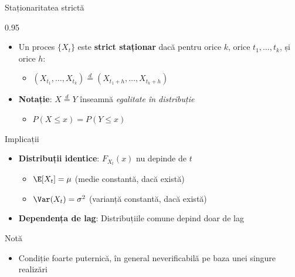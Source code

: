\documentclass[9pt, aspectratio=169, t]{beamer}
\begin{document}
\begin{frame}{Staționaritatea strictă}
    \begin{cminipage}{0.95\textwidth}
        \vspace{-0.25cm}
        \begin{defn}
            \begin{itemize}\setlength{\itemsep}{0pt}
                \item Un proces $\{X_t\}$ este \textbf{strict staționar} dacă pentru orice $k$, orice $t_1, \ldots, t_k$, și orice $h$:
                \begin{itemize}
                    \item $(X_{t_1}, \ldots, X_{t_k}) \stackrel{d}{=} (X_{t_1+h}, \ldots, X_{t_k+h})$
                \end{itemize}
                \item \textbf{Notație}: $X \stackrel{d}{=} Y$ înseamnă \textit{egalitate în distribuție}
                \begin{itemize}
                    \item $P(X \leq x) = P(Y \leq x)$
                \end{itemize}
            \end{itemize}
        \end{defn}
        \vspace{-0.1cm}
        \begin{block}{Implicații}
            \begin{itemize}\setlength{\itemsep}{0pt}
                \item \textbf{Distribuții identice}: $F_{X_t}(x)$ nu depinde de $t$
                \begin{itemize}
                    \item $\E[X_t] = \mu$ (medie constantă, dacă există)
                    \item $\Var(X_t) = \sigma^2$ (varianță constantă, dacă există)
                \end{itemize}
                \item \textbf{Dependența de lag}: Distribuțiile comune depind doar de lag
            \end{itemize}
        \end{block}

        \vspace{-0.2cm}

        \begin{alertblock}{Notă}
            \begin{itemize}\setlength{\itemsep}{0pt}
                \item Condiție foarte puternică, în general neverificabilă pe baza unei singure realizări
            \end{itemize}
        \end{alertblock}
    \end{cminipage}
\end{frame}
\end{document}
